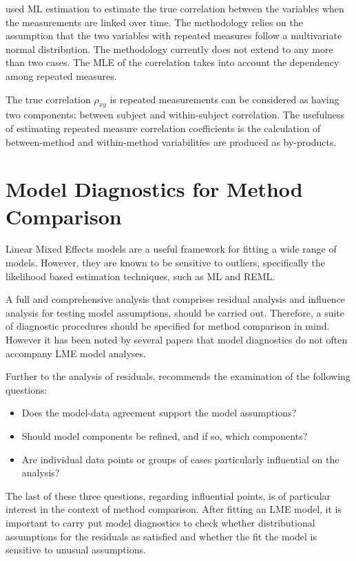 \documentclass[12pt, a4paper]{report}
\theoremstyle{definition}
\theoremstyle{remark}
\begin{document}
\citet{lam} used ML estimation to estimate the true correlation between the variables when the measurements are linked over time. The methodology relies on the assumption that the two variables with repeated measures follow a multivariate normal distribution. The methodology currently does not extend to any more than two cases. The MLE of the correlation takes into account the dependency among repeated measures.

The true correlation $\rho_{xy}$ is repeated measurements can be considered as having two components: between subject and within-subject correlation. The usefulness of estimating repeated measure correlation coefficients is the calculation of between-method and within-method variabilities are produced as by-products.




\section{Model Diagnostics for Method Comparison}
Linear Mixed Effects models are a useful framework for fitting a wide range of models. However, they are known to be sensitive to outliers, specifically the likelihood based estimation techniques, such as ML and REML. 

A full and comprehensive analysis that comprises residual analysis and influence analysis for testing model assumptions, should be carried out. Therefore, a suite of diagnostic procedures should be specified for method comparison in mind. However it has been noted by several papers \citep{Christensen, schabenberger} that model diagnostics do not often accompany LME model analyses. 

Further to the analysis of residuals, \citet{schabenberger} recommends the examination of the following questions:
\begin{itemize}
	\item Does the model-data agreement support the model assumptions?
	\item Should model components be refined, and if so, which components? 
	\item Are individual data points or groups of cases particularly
	influential on the analysis?
\end{itemize}
The last of these three questions, regarding influential points, is of particular interest in the context of method comparison. After fitting an LME model, it is important to carry put model diagnostics to check whether distributional assumptions for the residuals as satisfied and whether the fit the model is sensitive to unusual assumptions. 
\end{document}

